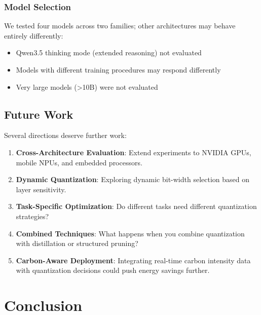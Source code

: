 \documentclass[conference]{IEEEtran}
\begin{document}
\subsubsection{Model Selection}

We tested four models across two families; other architectures may behave entirely differently:

\begin{itemize}[leftmargin=*,nosep]
    \item Qwen3.5 thinking mode (extended reasoning) not evaluated
    \item Models with different training procedures may respond differently
    \item Very large models (>10B) were not evaluated
\end{itemize}



\subsection{Future Work}

Several directions deserve further work:

\begin{enumerate}[leftmargin=*,nosep]
    \item \textbf{Cross-Architecture Evaluation}: Extend experiments to NVIDIA GPUs, mobile NPUs, and embedded processors.

    \item \textbf{Dynamic Quantization}: Exploring dynamic bit-width selection based on layer sensitivity.

    \item \textbf{Task-Specific Optimization}: Do different tasks need different quantization strategies?

    \item \textbf{Combined Techniques}: What happens when you combine quantization with distillation or structured pruning?

    \item \textbf{Carbon-Aware Deployment}: Integrating real-time carbon intensity data with quantization decisions could push energy savings further.
\end{enumerate}

\section{Conclusion}
\end{document}

